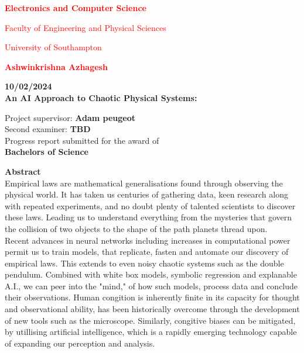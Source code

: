 \documentclass{article}
\begin{document}
\begin{center}
    \Large \textcolor{red}{\textbf{Electronics and Computer Science} \\[0.1cm]} 

    \large \textcolor{red}{Faculty of Engineering and Physical Sciences \\[0.1cm]} 

    \textcolor{red}{University of Southampton \\[1cm]} 

    \vspace{1cm} 

    \textcolor{red}{\textbf{\large Ashwinkrishna Azhagesh} \\[0.5cm]}

    \textbf{10/02/2024} \\[1cm] 

    \textbf{\large An AI Approach to Chaotic Physical Systems: } \\[1cm]

    \vspace{0.5cm}

    Project supervisor: \textbf{Adam peugeot} \\[0.3cm] 
    Second examiner: \textbf{TBD} \\[1cm]

    Progress report submitted for the award of \\[0.1cm]

    \textbf{\large Bachelors of Science} 
\end{center}

\newpage

{\Huge \textbf{Abstract}}\\[1cm]

Empirical laws are mathematical generalisations found through observing the physical world. It has taken us centuries of gathering data, keen research along with repeated experiments, and no doubt plenty of talented scientists to discover these laws. Leading us to understand everything from the mysteries that govern the collision of two objects to the shape of the path planets thread upon.\\

Recent advances in neural networks including increases in computational power permit us to train models, that replicate, fasten and automate our discovery of empirical laws. This extends to even noisy chaotic systems such as the double pendulum. Combined with white box models, symbolic regression and explanable A.I., we can peer into the "mind," of how such models, process data and conclude their observations. Human congition is inherently finite in its capacity for thought and observational ability, has been historically overcome through the development of new tools such as the microscope. Similarly, congitive biases can be mitigated, by utillising artificial intelligence, which is a rapidly emerging technology capable of expanding our perception and analysis.\\       
\end{document}
